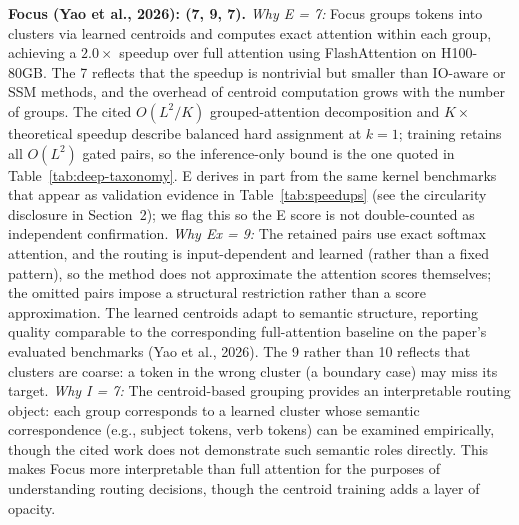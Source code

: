 \documentclass[10pt,twocolumn]{article}
\begin{document}
\textbf{Focus (Yao et al., 2026): (7, 9, 7).}
\textit{Why E = 7:} Focus groups tokens into clusters via learned centroids and computes exact attention within each group, achieving a $2.0\times$ speedup over full attention using FlashAttention on H100-80GB. The 7 reflects that the speedup is nontrivial but smaller than IO-aware or SSM methods, and the overhead of centroid computation grows with the number of groups. The cited $O(L^2/K)$ grouped-attention decomposition and $K\times$ theoretical speedup describe balanced hard assignment at $k{=}1$; training retains all $O(L^2)$ gated pairs, so the inference-only bound is the one quoted in Table~\ref{tab:deep-taxonomy}. E derives in part from the same kernel benchmarks that appear as validation evidence in Table~\ref{tab:speedups} (see the circularity disclosure in Section~2); we flag this so the E score is not double-counted as independent confirmation. \textit{Why Ex = 9:} The retained pairs use exact softmax attention, and the routing is input-dependent and learned (rather than a fixed pattern), so the method does not approximate the attention scores themselves; the omitted pairs impose a structural restriction rather than a score approximation. The learned centroids adapt to semantic structure, reporting quality comparable to the corresponding full-attention baseline on the paper's evaluated benchmarks (Yao et al., 2026). The 9 rather than 10 reflects that clusters are coarse: a token in the wrong cluster (a boundary case) may miss its target. \textit{Why I = 7:} The centroid-based grouping provides an interpretable routing object: each group corresponds to a learned cluster whose semantic correspondence (e.g., subject tokens, verb tokens) can be examined empirically, though the cited work does not demonstrate such semantic roles directly. This makes Focus more interpretable than full attention for the purposes of understanding routing decisions, though the centroid training adds a layer of opacity.
\end{document}
